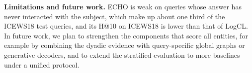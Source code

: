 \documentclass[runningheads]{llncs}
\makeatletter
\newcommand{\model}{ECHO}
\newcommand{\hten}{H@10}
\newcommand{\para}[1]{\smallskip\noindent\textbf{#1}}
\makeatother
\begin{document}
\para{Limitations and future work.} \model{} is weak on queries whose answer has never interacted with the subject, which make up about one third of the ICEWS18 test queries, and its \hten{} on ICEWS18 is lower than that of LogCL. In future work, we plan to strengthen the components that score all entities, for example by combining the dyadic evidence with query-specific global graphs or generative decoders, and to extend the stratified evaluation to more baselines under a unified protocol.



\end{document}
